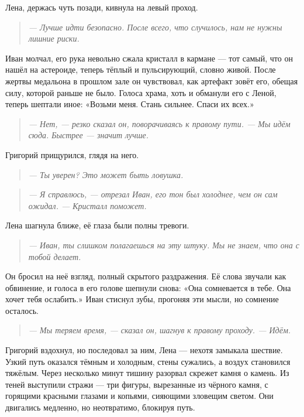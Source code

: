 \documentclass[12pt,a4paper]{book} %
\newenvironment{dialogue}{\begin{quote}\itshape}{\end{quote}}
\begin{document}
Лена, держась чуть позади, кивнула на левый проход.

\begin{dialogue}
--- Лучше идти безопасно. После всего, что случилось, нам не нужны лишние риски.
\end{dialogue}

Иван молчал, его рука невольно сжала кристалл в кармане --- тот самый, что он нашёл на астероиде, теперь тёплый и пульсирующий, словно живой. После жертвы медальона в прошлом зале он чувствовал, как артефакт зовёт его, обещая силу, которой раньше не было. Голоса храма, хоть и обманули его с Леной, теперь шептали иное: «Возьми меня. Стань сильнее. Спаси их всех.»

\begin{dialogue}
--- Нет, --- резко сказал он, поворачиваясь к правому пути. --- Мы идём сюда. Быстрее --- значит лучше.
\end{dialogue}

Григорий прищурился, глядя на него.

\begin{dialogue}
--- Ты уверен? Это может быть ловушка.
\end{dialogue}

\begin{dialogue}
--- Я справлюсь, --- отрезал Иван, его тон был холоднее, чем он сам ожидал. --- Кристалл поможет.
\end{dialogue}

Лена шагнула ближе, её глаза были полны тревоги.

\begin{dialogue}
--- Иван, ты слишком полагаешься на эту штуку. Мы не знаем, что она с тобой делает.
\end{dialogue}

Он бросил на неё взгляд, полный скрытого раздражения. Её слова звучали как обвинение, и голоса в его голове шепнули снова: «Она сомневается в тебе. Она хочет тебя ослабить.» Иван стиснул зубы, прогоняя эти мысли, но сомнение осталось.

\begin{dialogue}
--- Мы теряем время, --- сказал он, шагнув к правому проходу. --- Идём.
\end{dialogue}

Григорий вздохнул, но последовал за ним, Лена --- нехотя замыкала шествие. Узкий путь оказался тёмным и холодным, стены сужались, а воздух становился тяжёлым. Через несколько минут тишину разорвал скрежет камня о камень. Из теней выступили стражи --- три фигуры, вырезанные из чёрного камня, с горящими красными глазами и копьями, сияющими зловещим светом. Они двигались медленно, но неотвратимо, блокируя путь.
\end{document}
